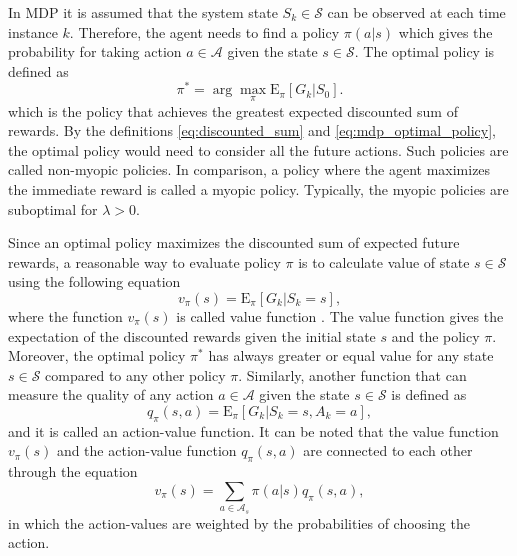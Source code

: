 \documentclass[english, 12pt, a4paper, elec, utf8, a-1b, online]{aaltothesis}
\newcommand{\Epolicy}[1]{\mathrm{E}_\pi \left[ #1 \right]}
\newcommand{\Ss}{\mathcal{S}}
\newcommand{\As}{\mathcal{A}}
\begin{document}
In MDP it is assumed that the system state $S_k \in \Ss$ can be observed at each time instance $k$.
Therefore, the agent needs to find a policy $\pi(a | s)$ which gives the probability for taking action $a \in \As$ given the state $s \in \Ss$.
The optimal policy is defined as
\begin{equation}\label{eq:mdp_optimal_policy}
    \pi^* = \arg\max_\pi\Epolicy{G_k | S_0}.
\end{equation}
which is the policy that achieves the greatest expected discounted sum of rewards.
By the definitions \eqref{eq:discounted_sum} and \eqref{eq:mdp_optimal_policy}, the optimal policy would need to consider all the future actions.
Such policies are called non-myopic policies.
In comparison, a policy where the agent maximizes the immediate reward is called a myopic policy. 
Typically, the myopic policies are suboptimal for $\lambda>0$.

Since an optimal policy maximizes the discounted sum of expected future rewards, a reasonable way to evaluate policy $\pi$ is to calculate value of state $s \in \Ss$ using the following equation
\begin{equation} \label{eq:value}
    v_\pi(s) = \Epolicy{G_k | S_k=s},
\end{equation}
where the function $v_\pi(s)$ is called value function \cite{Sutton2018}.
The value function gives the expectation of the discounted rewards given the initial state $s$ and the policy $\pi$.
Moreover, the optimal policy $\pi^*$ has always greater or equal value for any state $s \in \Ss$ compared to any other policy $\pi$.
Similarly, another function that can measure the quality of any action $a \in \As$ given the state $s \in \Ss$ is defined as
\begin{equation}\label{eq:action_value}
    q_\pi(s, a) = \Epolicy{G_k | S_k=s, A_k=a},
\end{equation}
and it is called an action-value function.
It can be noted that the value function $v_\pi(s)$ and the action-value function $ q_\pi(s, a)$ are connected to each other through the equation  
\begin{equation}\label{eq:value_action_value}
 v_\pi(s) =  \sum_{a\in \As_s} \pi(a | s) q_\pi(s, a),
\end{equation}
in which the action-values are weighted by the probabilities of choosing the action.
\end{document}
